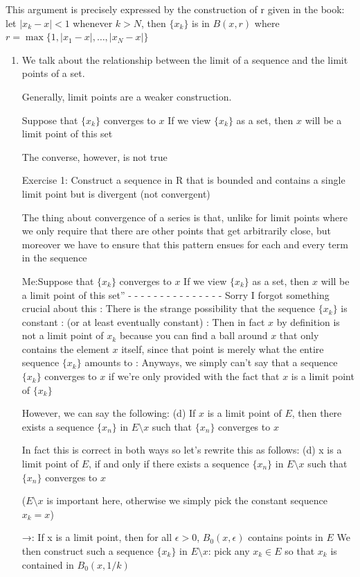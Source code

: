 This argument is precisely expressed by the construction of r given in the book: let $|x_k-x|<1$ whenever $k>N$, then $\{x_k\}$ is in $B(x,r)$ where $r=\max\{1,|x_1-x|,\dots,|x_N-x|\}$



\begin{enumerate}
\item We talk about the relationship between the limit of a sequence and the limit points of a set.

Generally, limit points are a weaker construction.


Suppose that $\{x_k\}$ converges to $x$
If we view $\{x_k\}$ as a set, then $x$ will be a limit point of this set

The converse, however, is not true

Exercise 1: Construct a sequence in R that is bounded and contains a single limit point but is divergent (not convergent)

The thing about convergence of a series is that, unlike for limit points where we only require that there are other points that get arbitrarily close, but moreover we have to ensure that this pattern ensues for each and every term in the sequence

Me:Suppose that $\{x_k\}$ converges to $x$
If we view $\{x_k\}$ as a set, then $x$ will be a limit point of this set”
- - - - - - - - - - - - - - -
Sorry I forgot something crucial about this
:
There is the strange possibility that the sequence $\{x_k\}$ is constant
:
(or at least eventually constant)
:
Then in fact $x$ by definition is not a limit point of $x_k$ because you can find a ball around $x$ that only contains the element $x$ itself, since that point is merely what the entire sequence $\{x_k\}$ amounts to
:
Anyways, we simply can't say that a sequence $\{x_k\}$ converges to $x$ if we're only provided with the fact that $x$ is a limit point of $\{x_k\}$

However, we can say the following:
(d) If $x$ is a limit point of $E$, then there exists a sequence $\{x_n\}$ in $E\setminus x$ such that $\{x_n\}$ converges to $x$

In fact this is correct in both ways so let's rewrite this as follows:
(d) x is a limit point of $E$, if and only if there exists a sequence $\{x_n\}$ in $E\setminus x$ such that $\{x_n\}$ converges to $x$

($E\setminus x$ is important here, otherwise we simply pick the constant sequence $x_k=x$)

→: If x is a limit point, then for all $\epsilon>0$, $B_0(x,\epsilon)$ contains points in $E$
We then construct such a sequence $\{x_k\}$ in $E\setminus x$: pick any $x_k \in E$ so that $x_k$ is contained in $B_0(x,1/k)$


\end{enumerate}
